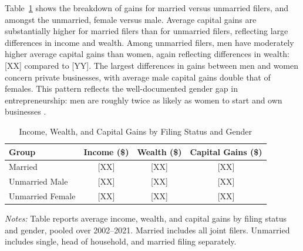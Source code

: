\documentclass[12pt]{article}
\begin{document}
Table~\ref{tab:kg_gender} shows the breakdown of gains for married versus unmarried filers, and amongst the unmarried, female versus male. Average capital gains are substantially higher for married filers than for unmarried filers, reflecting large differences in income and wealth. Among unmarried filers, men have moderately higher average capital gains than women, again reflecting differences in wealth: [XX] compared to [YY]. The largest differences in gains between men and women concern private businesses, with average male capital gains double that of females. This pattern reflects the well-documented gender gap in entrepreneurship: men are roughly twice as likely as women to start and own businesses \citep{kacperczyk2019gender}.

\begin{table}[H]
\centering
\caption{Income, Wealth, and Capital Gains by Filing Status and Gender}
\label{tab:kg_gender}
\small
\begin{tabular}{lccc}
\toprule
Group & Income (\$) & Wealth (\$) & Capital Gains (\$) \\
\midrule
Married          & [XX] & [XX] & [XX] \\
Unmarried Male   & [XX] & [XX] & [XX] \\
Unmarried Female & [XX] & [XX] & [XX] \\
\bottomrule
\end{tabular}
\begin{minipage}{0.9\textwidth}
\vspace{0.5em}
\footnotesize
\textit{Notes:} Table reports average income, wealth, and capital gains by filing status and gender, pooled over 2002--2021. Married includes all joint filers. Unmarried includes single, head of household, and married filing separately.
\end{minipage}
\end{table}
\end{document}
